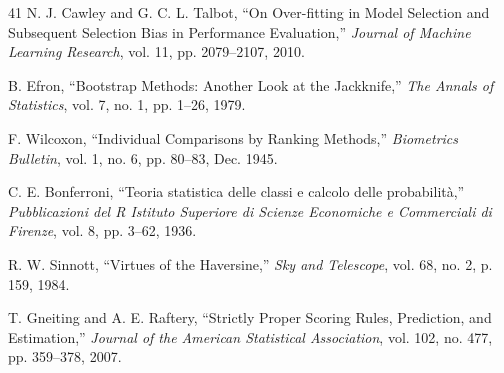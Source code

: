 \documentclass[conference]{IEEEtran}
\begin{document}
\begin{thebibliography}{41}
N. J. Cawley and G. C. L. Talbot, ``On Over-fitting in Model Selection and Subsequent Selection Bias in Performance Evaluation,'' \textit{Journal of Machine Learning Research}, vol. 11, pp. 2079--2107, 2010.

B. Efron, ``Bootstrap Methods: Another Look at the Jackknife,'' \textit{The Annals of Statistics}, vol. 7, no. 1, pp. 1--26, 1979.

F. Wilcoxon, ``Individual Comparisons by Ranking Methods,'' \textit{Biometrics Bulletin}, vol. 1, no. 6, pp. 80--83, Dec. 1945.

C. E. Bonferroni, ``Teoria statistica delle classi e calcolo delle probabilit\`a,'' \textit{Pubblicazioni del R Istituto Superiore di Scienze Economiche e Commerciali di Firenze}, vol. 8, pp. 3--62, 1936.

R. W. Sinnott, ``Virtues of the Haversine,'' \textit{Sky and Telescope}, vol. 68, no. 2, p. 159, 1984.

T. Gneiting and A. E. Raftery, ``Strictly Proper Scoring Rules, Prediction, and Estimation,'' \textit{Journal of the American Statistical Association}, vol. 102, no. 477, pp. 359--378, 2007.

\end{thebibliography}
\end{document}
